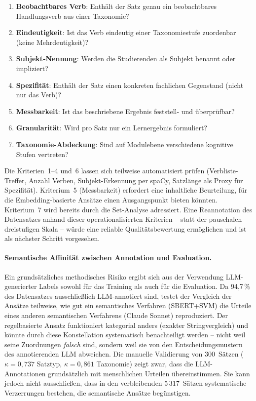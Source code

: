 \begin{enumerate}
  \item \textbf{Beobachtbares Verb}: Enthält der Satz genau ein beobachtbares Handlungsverb aus einer Taxonomie?
  \item \textbf{Eindeutigkeit}: Ist das Verb eindeutig einer Taxonomiestufe zuordenbar (keine Mehrdeutigkeit)?
  \item \textbf{Subjekt-Nennung}: Werden die Studierenden als Subjekt benannt oder impliziert?
  \item \textbf{Spezifität}: Enthält der Satz einen konkreten fachlichen Gegenstand (nicht nur das Verb)?
  \item \textbf{Messbarkeit}: Ist das beschriebene Ergebnis feststell- und überprüfbar?
  \item \textbf{Granularität}: Wird pro Satz nur ein Lernergebnis formuliert?
  \item \textbf{Taxonomie-Abdeckung}: Sind auf Modulebene verschiedene kognitive Stufen vertreten?
\end{enumerate}

Die Kriterien~1--4 und~6 lassen sich teilweise automatisiert prüfen (Verbliste-Treffer, Anzahl Verben, Subjekt-Erkennung per spaCy, Satzlänge als Proxy für Spezifität).
Kriterium~5 (Messbarkeit) erfordert eine inhaltliche Beurteilung, für die Embedding-basierte Ansätze einen Ausgangspunkt bieten könnten.
Kriterium~7 wird bereits durch die Set-Analyse adressiert.
Eine Reannotation des Datensatzes anhand dieser operationalisierten Kriterien -- statt der pauschalen dreistufigen Skala -- würde eine reliable Qualitätsbewertung ermöglichen und ist als nächster Schritt vorgesehen.

\paragraph{Semantische Affinität zwischen Annotation und Evaluation.}
Ein grundsätzliches methodisches Risiko ergibt sich aus der Verwendung LLM-generierter Labels sowohl für das Training als auch für die Evaluation.
Da 94{,}7\,\% des Datensatzes ausschließlich LLM-annotiert sind, testet der Vergleich der Ansätze teilweise, wie gut ein semantisches Verfahren (SBERT+SVM) die Urteile eines anderen semantischen Verfahrens (Claude Sonnet) reproduziert.
Der regelbasierte Ansatz funktioniert kategorial anders (exakter Stringvergleich) und könnte durch diese Konstellation systematisch benachteiligt werden -- nicht weil seine Zuordnungen \emph{falsch} sind, sondern weil sie von den Entscheidungsmustern des annotierenden LLM abweichen.
Die manuelle Validierung von 300~Sätzen ($\kappa = 0{,}737$ Satztyp, $\kappa = 0{,}861$ Taxonomie) zeigt zwar, dass die LLM-Annotationen grundsätzlich mit menschlichen Urteilen übereinstimmen.
Sie kann jedoch nicht ausschließen, dass in den verbleibenden 5\,317~Sätzen systematische Verzerrungen bestehen, die semantische Ansätze begünstigen.

